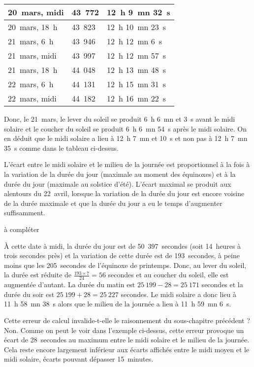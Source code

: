 \documentclass[a4paper]{article}
\newenvironment{texte}{\rmfamily}{}
\newcommand{\matable}{à compléter}
\begin{document}
\begin{texte}
\vspace{2mm}
\begin{tabular}{|l|l|l|}
\hline
20~mars, midi & 43~772 & 12~h 9~mn 32~s \\
\hline
20~mars, 18~h & 43~823 & 12~h 10~mn 23~s \\
\hline
21~mars, 6~h & 43~946 & 12~h 12~mn 6~s \\
\hline
21~mars, midi & 43~997 & 12~h 12~mn 57~s \\
\hline
21~mars, 18~h & 44~048 & 12~h 13~mn 48~s \\
\hline
22~mars, 6~h & 44~131 & 12~h 15~mn 31~s \\
\hline
22~mars, midi & 44~182 & 12~h 16~mn 22~s \\
\hline
\end{tabular}
\vspace{2mm}

Donc, le 21~mars, le lever du soleil se produit 6~h 6~mn et 3~s
avant le midi solaire et le coucher du soleil se produit
6~h 6~mn 54~s après le midi solaire. On en déduit que le
midi solaire a lieu à 12~h 7~mn et 10~s et non pas
à 12~h 7~mn 35~s comme dans le tableau ci-dessus.

L'écart entre le midi solaire et le milieu de la journée 
est proportionnel à la fois à la variation de la durée
du jour (maximale au moment des équinoxes) et à la durée du 
jour (maximale au solstice d'été). L'écart maximal se produit
aux alentours du 22~avril, lorsque la variation de la durée
du jour est encore voisine de la durée maximale et que la
durée du jour a eu le temps d'augmenter suffisamment.

\vspace{2mm}
\matable
\vspace{2mm}

À cette date à midi, la durée du jour est de 50~397~secondes (soit
14~heures à trois secondes près) et la variation de cette durée est de
193~secondes, à peine moins que les 205~secondes de l'équinoxe de
printemps. Donc, au lever du soleil, la durée est réduite de
$\frac{193 \times 7}{24} = 56 $ secondes et au coucher du soleil, elle
est augmentée d'autant. La durée du matin est $ 25~199 - 28 = 25~171 $
secondes et la durée du soir est $ 25~199 + 28 = 25~227 $ secondes.
Le midi solaire a donc lieu à 11~h 58~mn 38~s
alors que le milieu de la journée a lieu à 11~h 59~mn 6~s.

Cette erreur de calcul invalide-t-elle le raisonnement du
sous-chapitre précédent ? Non. Comme on peut le voir dans l'exemple
ci-dessus, cette erreur provoque un écart de 28~secondes au maximum
entre le midi solaire et le milieu de la journée. Cela reste encore
largement inférieur aux écarts affichés entre le midi moyen et le midi
solaire, écarts pouvant dépasser 15~minutes.


\end{texte}
\end{document}
